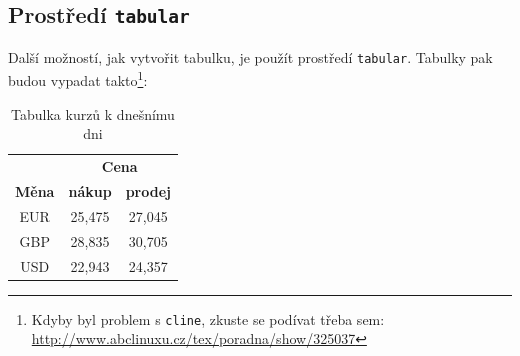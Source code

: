 \documentclass[a4paper, 11pt]{article}
\begin{document}
    \subsection{Prostředí \texttt{tabular}}
    Další možností, jak vytvořit tabulku, je použít prostředí \texttt{tabular}. Tabulky pak budou vypadat takto\footnote{Kdyby byl problem s \texttt{cline}, zkuste se podívat třeba sem: \href{http://www.abclinuxu.cz/tex/poradna/show/325037}{http://www.abclinuxu.cz/tex/poradna/show/325037}}:
    
    \hspace{0.2cm}
    
    \begin{center}
    \begin{table}[h]
        \centering
    	\begin{tabular}{|c|c|c|}
    		\hline 
    		& \multicolumn{2}{c|}{\textbf{Cena}}\\ 
    		\cline{2-3}
    		\textbf{Měna} & \textbf{nákup} & \textbf{prodej}\\
    		\hline
    		EUR & 25,475 & 27,045\\
    		GBP & 28,835 & 30,705\\
    		USD & 22,943 & 24,357\\
    		\hline
		\end{tabular}
    	\caption{Tabulka kurzů k dnešnímu dni}
    	\label{first_table}
    \end{table}
    
    \hspace{1cm}
    

\end{center}
\end{document}
